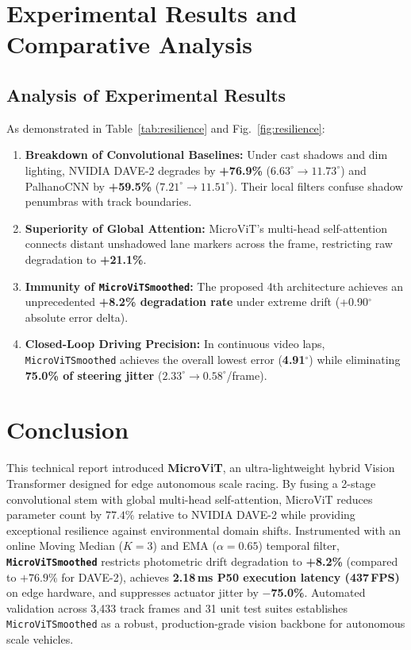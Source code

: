 \documentclass[10pt,journal,compsoc]{IEEEtran}
\begin{document}
\section{Experimental Results and Comparative Analysis}

\subsection{Analysis of Experimental Results}
As demonstrated in Table~\ref{tab:resilience} and Fig.~\ref{fig:resilience}:
\begin{enumerate}
    \item \textbf{Breakdown of Convolutional Baselines:} Under cast shadows and dim lighting, NVIDIA DAVE-2 degrades by \textbf{+76.9\%} ($6.63^\circ \to 11.73^\circ$) and PalhanoCNN by \textbf{+59.5\%} ($7.21^\circ \to 11.51^\circ$). Their local filters confuse shadow penumbras with track boundaries.
    \item \textbf{Superiority of Global Attention:} MicroViT's multi-head self-attention connects distant unshadowed lane markers across the frame, restricting raw degradation to \textbf{+21.1\%}.
    \item \textbf{Immunity of \texttt{MicroViTSmoothed}:} The proposed 4th architecture achieves an unprecedented \textbf{+8.2\% degradation rate} under extreme drift (+0.90$^\circ$ absolute error delta).
    \item \textbf{Closed-Loop Driving Precision:} In continuous video laps, \texttt{MicroViTSmoothed} achieves the overall lowest error (\textbf{4.91$^\circ$}) while eliminating \textbf{75.0\% of steering jitter} ($2.33^\circ \to 0.58^\circ$/frame).
\end{enumerate}

\section{Conclusion}
This technical report introduced \textbf{MicroViT}, an ultra-lightweight hybrid Vision Transformer designed for edge autonomous scale racing. By fusing a 2-stage convolutional stem with global multi-head self-attention, MicroViT reduces parameter count by $77.4\%$ relative to NVIDIA DAVE-2 while providing exceptional resilience against environmental domain shifts. Instrumented with an online Moving Median ($K=3$) and EMA ($\alpha=0.65$) temporal filter, \textbf{\texttt{MicroViTSmoothed}} restricts photometric drift degradation to \textbf{+8.2\%} (compared to $+76.9\%$ for DAVE-2), achieves \textbf{2.18\,ms P50 execution latency (437\,FPS)} on edge hardware, and suppresses actuator jitter by \textbf{$-$75.0\%}. Automated validation across 3,433 track frames and 31 unit test suites establishes \texttt{MicroViTSmoothed} as a robust, production-grade vision backbone for autonomous scale vehicles.
\end{document}
